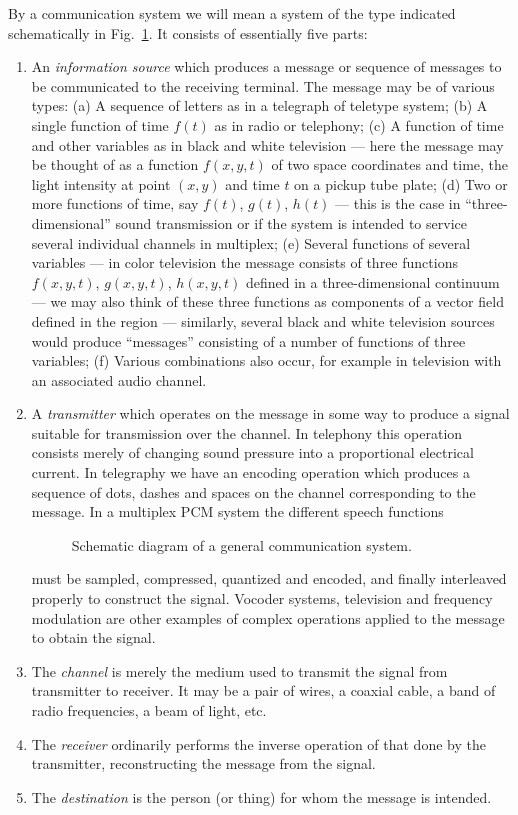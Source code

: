 By a communication system we will mean a system of the type indicated
schematically in Fig.~\ref{fig:1}.  It consists of essentially five parts:
\begin{enumerate}
\item
An \emph{information source} which produces a message or sequence of
messages to be communicated to the receiving terminal.  The message may be
of various types: (a) A sequence of letters as in a telegraph of
teletype system; (b) A single function of time $f(t)$ as in radio or
telephony; (c) A function of time and other variables as in black and white
television --- here the message may be thought of as a function $f(x,y,t)$ of
two space coordinates and time, the light intensity at point $(x,y)$ and
time $t$ on a pickup tube plate; (d) Two or more functions of time, say
$f(t)$, $g(t)$, $h(t)$ --- this is the case in ``three-dimensional'' sound
transmission or if the system is intended to service several individual
channels in multiplex; (e) Several functions of several variables --- in
color television the message consists of three functions $f(x,y,t)$,
$g(x,y,t)$, $h(x,y,t)$ defined in a three-dimensional continuum --- we may
also think of these three functions as components of a vector field defined
in the region --- similarly, several black and white television sources would
produce ``messages'' consisting of a number of functions of three
variables; (f) Various combinations also occur, for example in television
with an associated audio channel.
\item
A \emph{transmitter} which operates on the message in some way to produce a
signal suitable for transmission over the channel.  In telephony this
operation consists merely of changing sound pressure into a proportional
electrical current.  In telegraphy we have an encoding operation which
produces a sequence of dots, dashes and spaces on the channel corresponding
to the message.  In a multiplex PCM system the different speech functions
\begin{figure}
\centerline{}
\caption{Schematic diagram of a general communication system.}
\label{fig:1}
\end{figure}
must be sampled, compressed, quantized and encoded, and finally interleaved
properly to construct the signal.  Vocoder systems, television and
frequency modulation are other examples of complex operations applied to
the message to obtain the signal.
\item
The \emph{channel} is merely the medium used to transmit the signal from
transmitter to receiver.  It may be a pair of wires, a coaxial cable, a
band of radio frequencies, a beam of light, etc.

\item
The \emph{receiver} ordinarily performs the inverse operation of that done
by the transmitter, reconstructing the message from the signal.
\item
The \emph{destination} is the person (or thing) for whom the message is
intended.
\end{enumerate}

